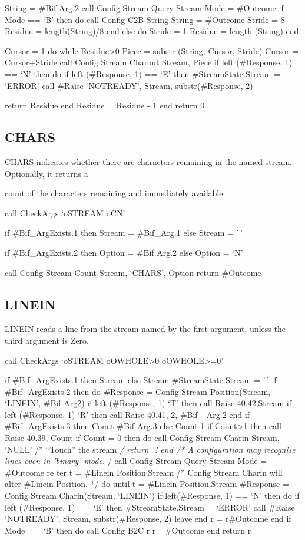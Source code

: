 String = \#Bif Arg.2 call Config Stream Query Stream Mode = \#Outcome if
Mode == `B' then do call Config C2B String String = \#Outcome Stride = 8
Residue = length(String)/8 end else do Stride = 1 Residue = length
(String) end

Cursor = 1 do while Residue\textgreater0 Piece = substr (String, Cursor,
Stride) Cursor = Cursor+Stride call Config Stream Charout Stream, Piece
if left (\#Response, 1) == `N' then do if left (\#Response, 1) == `E'
then \#StreamState.Stream = `ERROR' call \#Raise `NOTREADY', Stream,
substr(\#Response, 2)

return Residue end Residue = Residue - 1 end return 0

\subsection{CHARS}\label{chars}

CHARS indicates whether there are characters remaining in the named
stream. Optionally, it returns a

count of the characters remaining and immediately available.

call CheckArgs `oSTREAM oCN'

if \#Bif\_ArgExists.1 then Stream = \#Bif\_Arg.1 else Stream = '\,'

if \#Bif\_ArgExists.2 then Option = \#Bif Arg.2 else Option = `N'

call Config Stream Count Stream, `CHARS', Option return \#Outcome

\subsection{LINEIN}\label{linein}

LINEIN reads a line from the stream named by the first argument, unless
the third argument is Zero.

call CheckArgs `oSTREAM oOWHOLE\textgreater0 oOWHOLE\textgreater=0'

if \#Bif\_ArgExists.1 then Stream else Stream \#StreamState.Stream =
'\,' if \#Bif\_ArgExists.2 then do \#Response = Config Stream
Position(Stream, `LINEIN', \#Bif Arg2) if left (\#Response, 1) `T' then
call Raise 40.42,Stream if left (\#Response, 1) `R' then call Raise
40.41, 2, \#Bif\_ Arg.2 end if \#Bif\_ArgExists.3 then Count \#Bif Arg.3
else Count 1 if Count\textgreater1 then call Raise 40.39, Count if Count
= 0 then do call Config Stream Charin Stream, `NULL' /* ``Touch'' the
stream \emph{/ return `! end /* A configuration may recognise lines even
in 'binary' mode. }/ call Config Stream Query Stream Mode = \#Outcome re
ter t = \#Linein Position.Stream /* Config Stream Charin will alter
\#Linein Position. */ do until t = \#Linein Position.Stream \#Response =
Config Stream Charin(Stream, `LINEIN') if left(\#Response, 1) == `N'
then do if left (\#Response, 1) == `E' then \#StreamState.Stream =
`ERROR' call \#Raise `NOTREADY', Stream, substr(\#Response, 2) leave end
r = r\textbar\textbar\#Outcome end if Mode == `B' then do call Config
B2C r r= \#Outcome end return r

